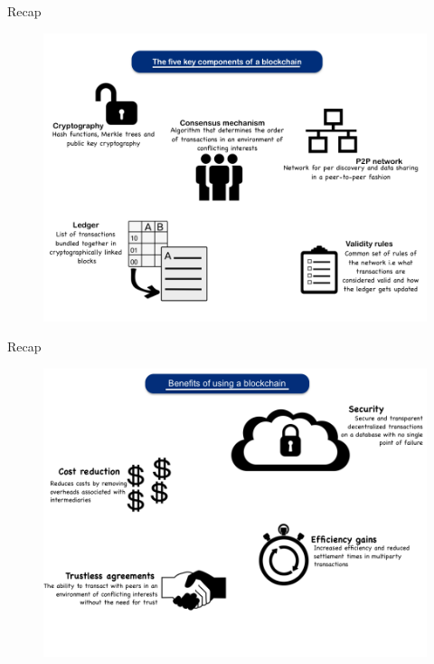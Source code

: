 \documentclass[9pt]{beamer}
\begin{document}

\begin{frame}{Recap}
	\begin{figure}[]
		\centering
		\includegraphics  [scale=0.3]{Images/block-key}
	\end{figure}
\end{frame}


\begin{frame}{Recap}
	\begin{figure}[]
		\centering
		\includegraphics  [scale=0.3]{Images/benefits}
	\end{figure}
\end{frame}
\end{document}
